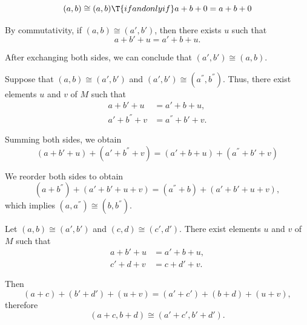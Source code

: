 \begin{defproof}
  \begin{equation*}
    (a, b) \cong (a, b) \T{if and only if} a + b + 0 = a + b + 0
  \end{equation*}

   By commutativity, if \( (a, b) \cong (a', b') \), then there exists \( u \) such that
  \begin{equation*}
    a + b' + u = a' + b + u.
  \end{equation*}

  After exchanging both sides, we can conclude that \( (a', b') \cong (a, b) \).

   Suppose that \( (a, b) \cong (a', b') \) and \( (a', b') \cong (a^\dprime, b^\dprime) \). Thus, there exist elements \( u \) and \( v \) of \( M \) such that
  \begin{align*}
    a + b' + u         &= a' + b + u, \\
    a' + b^\dprime + v &= a^\dprime + b' + v.
  \end{align*}

  Summing both sides, we obtain
  \begin{equation*}
    (a + b' + u) + (a' + b^\dprime + v) = (a' + b + u) + (a^\dprime + b' + v)
  \end{equation*}

  We reorder both sides to obtain
  \begin{equation*}
    (a + b^\dprime) + (a' + b' + u + v) = (a^\dprime + b) + (a' + b' + u + v),
  \end{equation*}
  which implies \( (a, a^\dprime) \cong (b, b^\dprime) \).

   Let \( (a, b) \cong (a', b') \) and \( (c, d) \cong (c', d') \). There exist elements \( u \) and \( v \) of \( M \) such that
  \begin{align*}
    a + b' + u &= a' + b + u, \\
    c' + d + v &= c + d' + v.
  \end{align*}

  Then
  \begin{equation*}
    (a + c) + (b' + d') + (u + v) = (a' + c') + (b + d) + (u + v),
  \end{equation*}
  therefore
  \begin{equation*}
    (a + c, b + d) \cong (a' + c', b' + d').
  \end{equation*}


\end{defproof}
